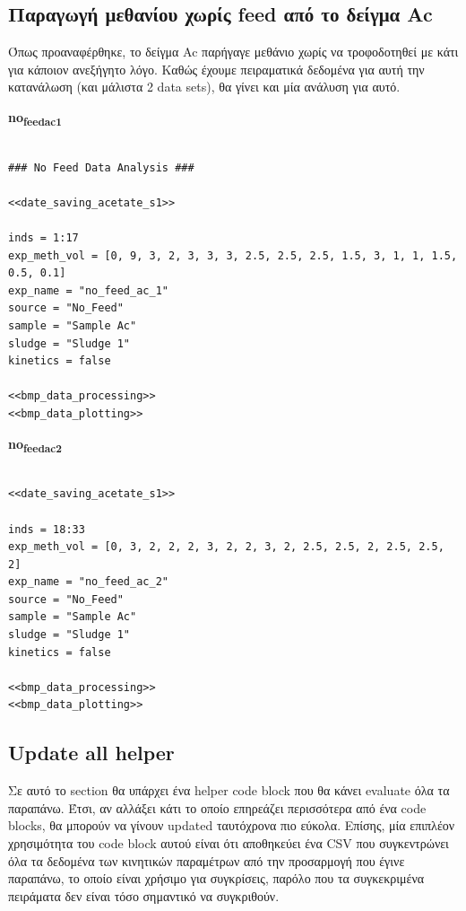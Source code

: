 \documentclass[11pt]{article}
\begin{document}
\subsection{Παραγωγή μεθανίου χωρίς feed από το δείγμα Ac}
\label{sec:orgaab3c29}
Όπως προαναφέρθηκε, το δείγμα Ac παρήγαγε μεθάνιο χωρίς να τροφοδοτηθεί με κάτι για κάποιον ανεξήγητο λόγο. Καθώς έχουμε πειραματικά δεδομένα για αυτή την κατανάλωση (και μάλιστα 2 data sets), θα γίνει και μία ανάλυση για αυτό.

\textbf{no\textsubscript{feed}\textsubscript{ac}\textsubscript{1}}
\begin{verbatim}

### No Feed Data Analysis ###

<<date_saving_acetate_s1>>

inds = 1:17
exp_meth_vol = [0, 9, 3, 2, 3, 3, 3, 2.5, 2.5, 2.5, 1.5, 3, 1, 1, 1.5, 0.5, 0.1]
exp_name = "no_feed_ac_1"
source = "No_Feed"
sample = "Sample Ac"
sludge = "Sludge 1"
kinetics = false

<<bmp_data_processing>>
<<bmp_data_plotting>>
\end{verbatim}

\textbf{no\textsubscript{feed}\textsubscript{ac}\textsubscript{2}}
\begin{verbatim}

<<date_saving_acetate_s1>>

inds = 18:33
exp_meth_vol = [0, 3, 2, 2, 2, 3, 2, 2, 3, 2, 2.5, 2.5, 2, 2.5, 2.5, 2]
exp_name = "no_feed_ac_2"
source = "No_Feed"
sample = "Sample Ac"
sludge = "Sludge 1"
kinetics = false

<<bmp_data_processing>>
<<bmp_data_plotting>>
\end{verbatim}

\subsection{Update all helper}
\label{sec:org21a3ada}
Σε αυτό το section θα υπάρχει ένα helper code block που θα κάνει evaluate όλα τα παραπάνω. Έτσι, αν αλλάξει κάτι το οποίο επηρεάζει περισσότερα από ένα code blocks, θα μπορούν να γίνουν updated ταυτόχρονα πιο εύκολα. Επίσης, μία επιπλέον χρησιμότητα του code block αυτού είναι ότι αποθηκεύει ένα CSV που συγκεντρώνει όλα τα δεδομένα των κινητικών παραμέτρων από την προσαρμογή που έγινε παραπάνω, το οποίο είναι χρήσιμο για συγκρίσεις, παρόλο που τα συγκεκριμένα πειράματα δεν είναι τόσο σημαντικό να συγκριθούν.
\end{document}
